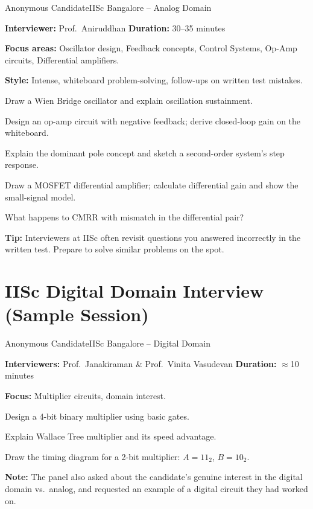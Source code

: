 \begin{experience}{Anonymous Candidate}{IISc Bangalore -- Analog Domain}

  \textbf{Interviewer:} Prof.\ Aniruddhan
  \hfill\textbf{Duration:} 30--35 minutes

  \vspace{4pt}
  \textbf{Focus areas:} Oscillator design, Feedback concepts, Control Systems,
  Op-Amp circuits, Differential amplifiers.

  \vspace{4pt}
  \textbf{Style:} Intense, whiteboard problem-solving, follow-ups on written
  test mistakes.

  \begin{pfChecklist}
    \item Draw a Wien Bridge oscillator and explain oscillation sustainment.
    \item Design an op-amp circuit with negative feedback; derive closed-loop
          gain on the whiteboard.
    \item Explain the dominant pole concept and sketch a second-order system's
          step response.
    \item Draw a MOSFET differential amplifier; calculate differential gain and
          show the small-signal model.
    \item What happens to CMRR with mismatch in the differential pair?
  \end{pfChecklist}

  \textbf{Tip:} Interviewers at IISc often revisit questions you answered
  incorrectly in the written test. Prepare to solve similar problems on the spot.
\end{experience}

\section{IISc Digital Domain Interview (Sample Session)}
\label{sec:iisc-digital-session}

\begin{experience}{Anonymous Candidate}{IISc Bangalore -- Digital Domain}

  \textbf{Interviewers:} Prof.\ Janakiraman \& Prof.\ Vinita Vasudevan
  \hfill\textbf{Duration:} $\approx$10 minutes

  \vspace{4pt}
  \textbf{Focus:} Multiplier circuits, domain interest.

  \begin{pfChecklist}
    \item Design a 4-bit binary multiplier using basic gates.
    \item Explain Wallace Tree multiplier and its speed advantage.
    \item Draw the timing diagram for a 2-bit multiplier: $A=11_2$, $B=10_2$.
  \end{pfChecklist}

  \textbf{Note:} The panel also asked about the candidate's genuine interest in
  the digital domain vs.\ analog, and requested an example of a digital circuit
  they had worked on.
\end{experience}
